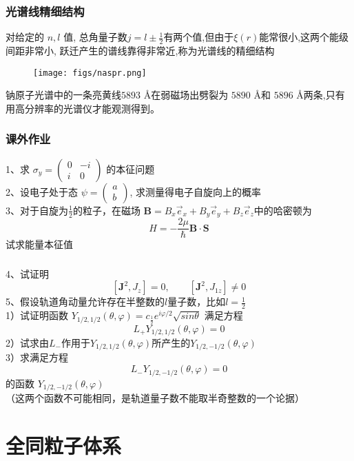 \begin{frame}[label=current]
  \frametitle{光谱线精细结构}
  对给定的 $n,l$ 值, 总角量子数$j=l\pm \frac{1}{2}$有两个值,但由于$\xi(r)$能常很小,这两个能级间距非常小, 跃迁产生的谱线靠得非常近,称为光谱线的精细结构
  \begin{figure}[htbp]
    \centering
    \texttt{[image: figs/naspr.png]}
  \end{figure}
  钠原子光谱中的一条亮黄线$5893$ \AA 在弱磁场出劈裂为 $5890$ \AA 和 $5896$ \AA 两条,只有用高分辨率的光谱仪才能观测得到。 
\end{frame} 


\begin{frame}[label=current]
  \frametitle{课外作业}
  1、求   $\sigma _y  =  \begin{pmatrix}
    0 & -i\\
    i & 0
   \end{pmatrix} $ 的本征问题 \\

  2、设电子处于态 $\psi=\begin{pmatrix}
    a\\
    b
   \end{pmatrix}  $, 求测量得电子自旋向上的概率 \\

  3、对于自旋为$\frac{1}{2}$的粒子，在磁场 $\mathbf{B} = B_x \vec{e}_x + B_y \vec{e}_y + B_z \vec{e}_z$中的哈密顿为
  \[ H = - \frac{2\mu}{\hbar}\mathbf{B}\cdot \mathbf{S}\]
  试求能量本征值 \\
\end{frame} 


\begin{frame}[label=current]
  \frametitle{}
  4、试证明 \[ [\mathbf{J}^2, J_z] =0, \qquad [\mathbf{J}^2, J_{1z}] \ne 0\]
  5、假设轨道角动量允许存在半整数的$l$量子数，比如$l=\frac{1}{2}$\\
    1）试证明函数 $Y_{1/2,1/2}(\theta, \varphi) = c_{\frac{1}{2}}e^{i \varphi/2} \sqrt{sin\theta}$ 满足方程 $$ L_+ Y_{1/2,1/2}(\theta, \varphi) =0 $$
    2）试求由$L_{-}$作用于$Y_{1/2,1/2}(\theta, \varphi)$所产生的$Y_{1/2,-1/2}(\theta, \varphi)$\\
    3）求满足方程$$ L_{-}Y_{1/2,-1/2}(\theta, \varphi) =0 $$ 的函数 $Y_{1/2,-1/2}(\theta, \varphi)$ \\ （这两个函数不可能相同，是轨道量子数不能取半奇整数的一个论据） 
\end{frame} 

\section{全同粒子体系 }
